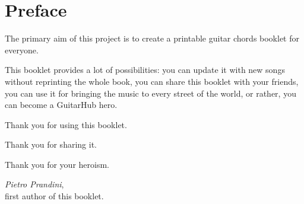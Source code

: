 \section*{Preface}
The primary aim of this project is to create a printable guitar chords booklet for everyone.\par
\medskip
This booklet provides a lot of possibilities: you can update it with new songs without reprinting the whole book,
you can share this booklet with your friends, you can use it for bringing the music to every street of the world, or rather, you can become a GuitarHub hero.\par
\medskip
Thank you for using this booklet.\par
\smallskip
Thank you for sharing it.\par
\smallskip
Thank you for your heroism.\par
\bigskip
\begin{flushright}
	{\textit{\rmfamily Pietro Prandini}},\\
	first author of this booklet.\par
\end{flushright}
\newpage
